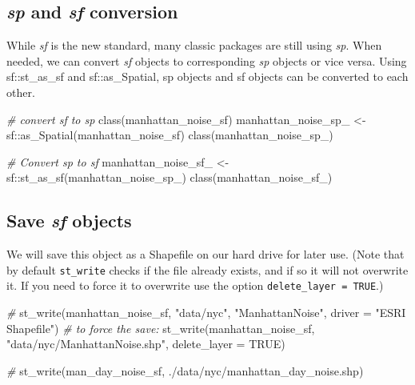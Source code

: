 \documentclass[
  11pt,
]{book}
\newenvironment{Shaded}{\begin{snugshade}}{\end{snugshade}}
\newcommand{\AttributeTok}[1]{\textcolor[rgb]{0.77,0.63,0.00}{#1}}
\newcommand{\CommentTok}[1]{\textcolor[rgb]{0.56,0.35,0.01}{\textit{#1}}}
\newcommand{\ConstantTok}[1]{\textcolor[rgb]{0.00,0.00,0.00}{#1}}
\newcommand{\FunctionTok}[1]{\textcolor[rgb]{0.00,0.00,0.00}{#1}}
\newcommand{\NormalTok}[1]{#1}
\newcommand{\OtherTok}[1]{\textcolor[rgb]{0.56,0.35,0.01}{#1}}
\newcommand{\SpecialCharTok}[1]{\textcolor[rgb]{0.00,0.00,0.00}{#1}}
\newcommand{\StringTok}[1]{\textcolor[rgb]{0.31,0.60,0.02}{#1}}
\begin{document}
\hypertarget{sp-and-sf-conversion}{%
\subsection{\texorpdfstring{\emph{sp} and \emph{sf} conversion}{sp and sf conversion}}\label{sp-and-sf-conversion}}

While \emph{sf} is the new standard, many classic packages are still using \emph{sp}. When needed, we can convert \emph{sf} objects to corresponding \emph{sp} objects or vice versa. Using sf::st\_as\_sf and sf::as\_Spatial, sp objects and sf objects can be converted to each other.

\begin{Shaded}
\begin{Highlighting}[]
\CommentTok{\# convert sf to sp}
\FunctionTok{class}\NormalTok{(manhattan\_noise\_sf)}
\NormalTok{manhattan\_noise\_sp\_ }\OtherTok{\textless{}{-}}\NormalTok{ sf}\SpecialCharTok{::}\FunctionTok{as\_Spatial}\NormalTok{(manhattan\_noise\_sf)}
\FunctionTok{class}\NormalTok{(manhattan\_noise\_sp\_)}

\CommentTok{\# Convert sp to sf}
\NormalTok{manhattan\_noise\_sf\_ }\OtherTok{\textless{}{-}}\NormalTok{ sf}\SpecialCharTok{::}\FunctionTok{st\_as\_sf}\NormalTok{(manhattan\_noise\_sp\_) }
\FunctionTok{class}\NormalTok{(manhattan\_noise\_sf\_)}
\end{Highlighting}
\end{Shaded}

\hypertarget{save-sf-objects}{%
\subsection{\texorpdfstring{Save \emph{sf} objects}{Save sf objects}}\label{save-sf-objects}}

We will save this object as a Shapefile on our hard drive for later use. (Note that by default \texttt{st\_write} checks if the file already exists, and if so it will not overwrite it. If you need to force it to overwrite use the option \texttt{delete\_layer\ =\ TRUE}.)

\begin{Shaded}
\begin{Highlighting}[]
\CommentTok{\# }
\FunctionTok{st\_write}\NormalTok{(manhattan\_noise\_sf, }\StringTok{"data/nyc"}\NormalTok{, }\StringTok{"ManhattanNoise"}\NormalTok{, }\AttributeTok{driver =} \StringTok{"ESRI Shapefile"}\NormalTok{)}
\CommentTok{\# to force the save: }
\FunctionTok{st\_write}\NormalTok{(manhattan\_noise\_sf, }\StringTok{"data/nyc/ManhattanNoise.shp"}\NormalTok{, }\AttributeTok{delete\_layer =} \ConstantTok{TRUE}\NormalTok{)}

\CommentTok{\# }
\FunctionTok{st\_write}\NormalTok{(man\_day\_noise\_sf, }\StringTok{\textquotesingle{}./data/nyc/manhattan\_day\_noise.shp\textquotesingle{}}\NormalTok{)}
\end{Highlighting}
\end{Shaded}
\end{document}
